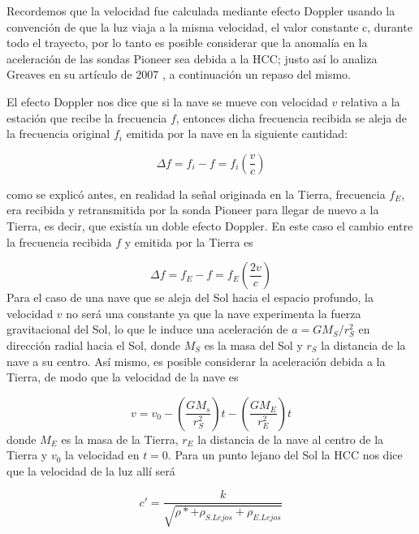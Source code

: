 Recordemos que la velocidad fue calculada mediante efecto Doppler usando la convención de que la luz viaja a la misma velocidad, el valor constante c, durante todo el trayecto, por lo tanto es posible considerar que la anomalía en la aceleración de las sondas Pioneer sea debida a la \ac{HCC}; justo así lo analiza Greaves en su artículo de 2007 \cite{Cisnotconstant}, a continuación un repaso del mismo. 

El efecto Doppler nos dice que si la nave se mueve con velocidad $v$ relativa a la estación que recibe la frecuencia $f$, entonces dicha frecuencia recibida se aleja de la frecuencia original $f_i$ emitida por la nave en la siguiente cantidad:

\begin{equation} \label{doppleroriginal}
    \Delta f = f_i-f =f_i \left( \frac{v}{c}\right)
\end{equation}

como se explicó antes, en realidad la señal originada en la Tierra, frecuencia $f_E$, era recibida y retransmitida por la sonda Pioneer para llegar de nuevo a la Tierra, es decir, que existía un doble efecto Doppler. En este caso el cambio entre la frecuencia recibida $f$ y emitida por la Tierra es

\begin{equation} \label{doppler}
    \Delta f = f_E - f = f_E \left( \frac{2v}{c} \right)
\end{equation}
Para el caso de una nave que se aleja del Sol hacia el espacio profundo, la velocidad $v$ no será una constante ya que la nave experimenta la fuerza gravitacional del Sol, lo que le induce una aceleración de  $a = G M_S / r_S^2$ en dirección radial hacia el Sol, donde $M_S$ es la masa del Sol y $r_S$ la distancia de la nave a su centro. Así mismo, es posible considerar la aceleración debida a la Tierra, de modo que la velocidad de la nave es

\begin{equation} \label{velocidad}
    v = v_0 - \left( \frac{G M_s}{r_S^2} \right) t- \left( \frac{GM_E}{r_E^2}\right)t
\end{equation}
donde $M_E$ es la masa de la Tierra, $r_E$ la distancia de la nave al centro de la Tierra y $v_0$ la velocidad en $t=0$. Para un punto lejano del Sol la \ac{HCC} nos dice que la velocidad de la luz allí será

\begin{equation} \label{5}
    c'=\frac{k}{\sqrt{\rho*+\rho_{S.Lejos}+\rho_{E.Lejos}}}
\end{equation}

